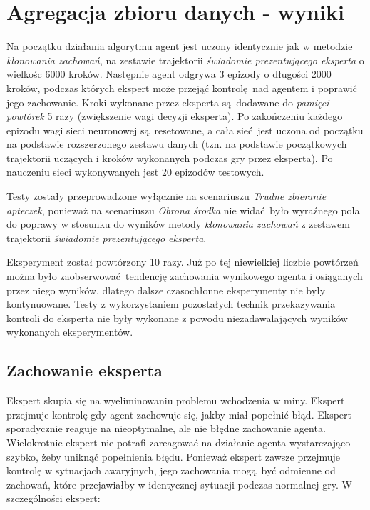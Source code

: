 \section{Agregacja zbioru danych - wyniki}

Na początku działania algorytmu agent jest uczony identycznie jak w metodzie \textit{klonowania zachowań}, na zestawie trajektorii \textit{świadomie prezentującego eksperta} o wielkośc 6000 kroków. Następnie agent odgrywa 3 epizody o długości 2000 kroków, podczas których ekspert może przejąć kontrolę nad agentem i poprawić jego zachowanie. Kroki wykonane przez eksperta są dodawane do \textit{pamięci powtórek} 5 razy (zwiększenie wagi decyzji eksperta). Po zakończeniu każdego epizodu wagi sieci neuronowej są resetowane, a cała sieć jest uczona od początku na podstawie rozszerzonego zestawu danych (tzn. na podstawie początkowych trajektorii uczących i kroków wykonanych podczas gry przez eksperta). Po nauczeniu sieci wykonywanych jest 20 epizodów testowych.

Testy zostały przeprowadzone wyłącznie na scenariuszu \textit{Trudne zbieranie apteczek}, ponieważ na scenariuszu \textit{Obrona środka} nie widać było wyraźnego pola do poprawy w stosunku do wyników metody \textit{klonowania zachowań} z zestawem trajektorii \textit{świadomie prezentującego eksperta}.

Eksperyment został powtórzony 10 razy. Już po tej niewielkiej liczbie powtórzeń można było zaobserwować tendencję zachowania wynikowego agenta i osiąganych przez niego wyników, dlatego dalsze czasochłonne eksperymenty nie były kontynuowane. Testy z wykorzystaniem pozostałych technik przekazywania kontroli do eksperta nie były wykonane z powodu niezadawalających wyników wykonanych eksperymentów.

\subsection {Zachowanie eksperta}
Ekspert skupia się na wyeliminowaniu problemu wchodzenia w miny. Ekspert przejmuje kontrolę gdy agent zachowuje się, jakby miał popełnić błąd. Ekspert sporadycznie reaguje na nieoptymalne, ale nie błędne zachowanie agenta. Wielokrotnie ekspert nie potrafi zareagować na działanie agenta wystarczająco szybko, żeby uniknąć popełnienia błędu. Ponieważ ekspert zawsze przejmuje kontrolę w sytuacjach awaryjnych, jego zachowania mogą być odmienne od zachowań, które przejawiałby w identycznej sytuacji podczas normalnej gry. W szczególności ekspert:

